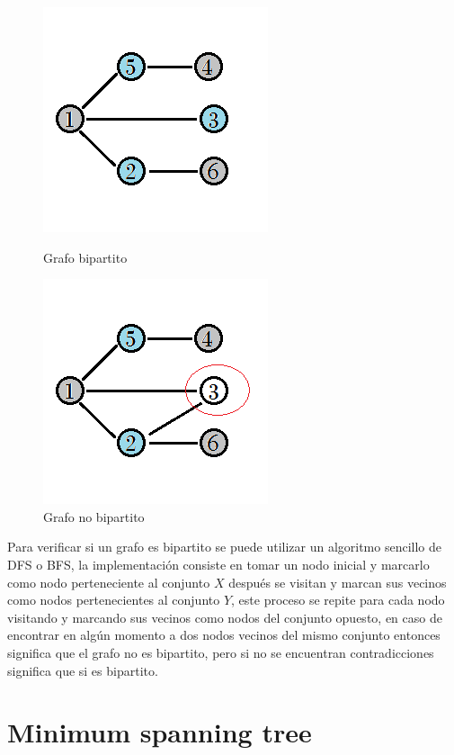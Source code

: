 \documentclass[12pt, a4paper]{article}
\newcommand\cppfile[2][]{

}
\begin{document}
	\begin{figure}[!htb]
			\centering
			\includegraphics[scale=1]{Grafos/imagenes/bipartitos/BipartitoSi}
			\caption{Grafo bipartito}
			\label{grafos:bipartitos:BipartitoSi}
		\endminipage
			\centering
			\includegraphics[scale=1]{Grafos/imagenes/bipartitos/BipartitoNo}
			\caption{Grafo no bipartito}
			\label{grafos:bipartitos:BipartitoNo}
		\endminipage
	\end{figure}	
	
	Para verificar si un grafo es bipartito se puede utilizar un algoritmo sencillo de DFS o BFS, la implementación
	consiste en tomar un nodo inicial y marcarlo como nodo perteneciente al conjunto $X$ después se visitan y marcan 
	sus vecinos como nodos pertenecientes al conjunto $Y$, este proceso se repite para cada nodo visitando y marcando 
	sus vecinos como nodos del conjunto opuesto, en caso de encontrar en algún momento a dos nodos vecinos del mismo
	conjunto entonces significa que el grafo no es bipartito, pero si no se encuentran contradicciones significa que 
	si es bipartito.
	\cppfile[14-42]{Grafos/codigos/BipartiteCheck.cpp}
	
	\section{Minimum spanning tree}
	
\end{document}

